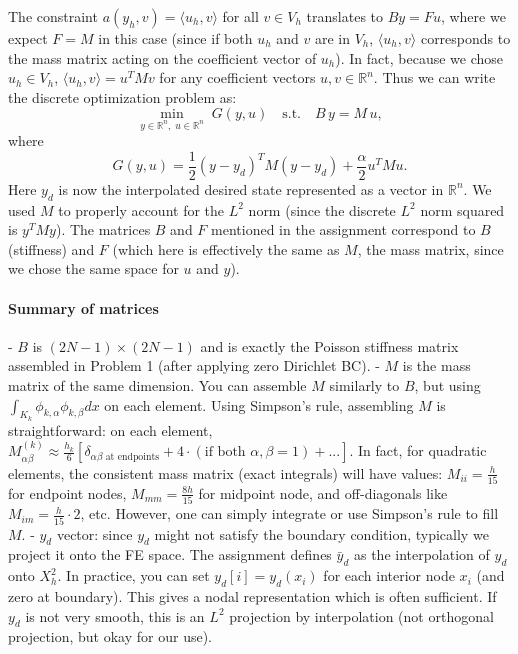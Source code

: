 \documentclass[a4paper,10pt]{article}
\begin{document}
The constraint \(a(y_h,v) = \langle u_h,v\rangle\) for all \(v\in V_h\) translates to \(B y = F u\), where we expect \(F = M\) in this case (since if both \(u_h\) and \(v\) are in \(V_h\), \(\langle u_h, v\rangle\) corresponds to the mass matrix acting on the coefficient vector of \(u_h\)).
In fact, because we chose \(u_h \in V_h\), \(\langle u_h, v\rangle = u^T M v\) for any coefficient vectors \(u,v \in \mathbb{R}^n\).
Thus we can write the discrete optimization problem as:
\[\min_{y \in \mathbb{R}^n,\;u \in \mathbb{R}^n} \; G(y,u) \quad \text{s.t.}\quad B\,y = M\,u,\]
where
\[G(y,u) = \frac{1}{2}(y - y_d)^T M (y - y_d) + \frac{\alpha}{2} u^T M u.\]
Here \(y_d\) is now the interpolated desired state represented as a vector in \(\mathbb{R}^n\). We used \(M\) to properly account for the \(L^2\) norm (since the discrete \(L^2\) norm squared is \(y^T M y\)). The matrices \(B\) and \(F\) mentioned in the assignment correspond to \(B\) (stiffness) and \(F\) (which here is effectively the same as \(M\), the mass matrix, since we chose the same space for \(u\) and \(y\)).

\paragraph{Summary of matrices}
- \(B\) is \((2N-1)\times(2N-1)\) and is exactly the Poisson stiffness matrix assembled in Problem 1 (after applying zero Dirichlet BC).
- \(M\) is the mass matrix of the same dimension. You can assemble \(M\) similarly to \(B\), but using \(\int_{K_k} \phi_{k,\alpha}\phi_{k,\beta} dx\) on each element. Using Simpson's rule, assembling \(M\) is straightforward: on each element, \(M^{(k)}_{\alpha\beta} \approx \frac{h_k}{6} [\delta_{\alpha\beta \text{ at endpoints}} + 4\cdot (\text{if both }\alpha,\beta=1) + ...]\).
In fact, for quadratic elements, the consistent mass matrix (exact integrals) will have values: \(M_{ii} = \frac{h}{15}\) for endpoint nodes, \(M_{mm}=\frac{8h}{15}\) for midpoint node, and off-diagonals like \(M_{im} = \frac{h}{15}\cdot 2\), etc. However, one can simply integrate or use Simpson's rule to fill \(M\).
- \(y_d\) vector: since \(y_d\) might not satisfy the boundary condition, typically we project it onto the FE space. The assignment defines \(\bar{y}_d\) as the interpolation of \(y_d\) onto \(X_h^2\). In practice, you can set \(y_d[i] = y_d(x_i)\) for each interior node \(x_i\) (and zero at boundary). This gives a nodal representation which is often sufficient. If \(y_d\) is not very smooth, this is an \(L^2\) projection by interpolation (not orthogonal projection, but okay for our use).
\end{document}
